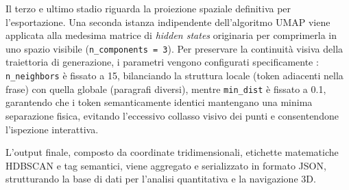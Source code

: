Il terzo e ultimo stadio riguarda la proiezione spaziale definitiva per l'esportazione. Una seconda istanza indipendente dell'algoritmo UMAP viene applicata alla medesima matrice di \textit{hidden states} originaria per comprimerla in uno spazio visibile (\texttt{n\_components = 3}). Per preservare la continuità visiva della traiettoria di generazione, i parametri vengono configurati specificamente \cite{mcinnes2018umap}: \texttt{n\_neighbors} è fissato a 15, bilanciando la struttura locale (token adiacenti nella frase) con quella globale (paragrafi diversi), mentre \texttt{min\_dist} è fissato a 0.1, garantendo che i token semanticamente identici mantengano una minima separazione fisica, evitando l'eccessivo collasso visivo dei punti e consentendone l'ispezione interattiva.

L'output finale, composto da coordinate tridimensionali, etichette matematiche HDBSCAN e tag semantici, viene aggregato e serializzato in formato JSON, strutturando la base di dati per l'analisi quantitativa e la navigazione 3D.